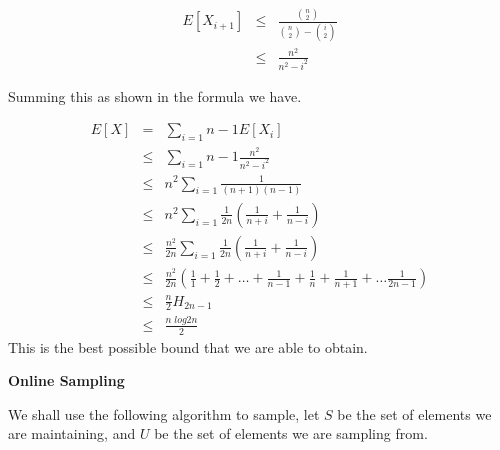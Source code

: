 \documentclass{assignment}
\begin{document}
\begin{problemlist}
\begin{problem}
\begin{answer}
\begin{eqnarray}
E[X_{i+1}] & \leq & \frac{\binom{n}{2}}{\binom{n}{2} - \binom{i}{2}} \\
 & \leq & \frac{n^2}{n^2 - i^2}
\end{eqnarray}

Summing this as shown in the formula we have. 

\begin{eqnarray}
E[X] & = & \sum_{i=1}{n-1}E[X_i] \\
& \leq & \sum_{i=1}{n-1} \frac{n^2}{n^2 - i^2} \\
& \leq & {n^2} \sum_{i=1}\frac{1}{(n+1)(n-1)} \\
& \leq & {n^2} \sum_{i=1}\frac{1}{2n} \left( \frac{1}{n+i} + \frac{1}{n-i} \right) \\
& \leq & \frac{n^2}{2n} \sum_{i=1}\frac{1}{2n} \left( \frac{1}{n+i} + \frac{1}{n-i} \right) \\
& \leq & \frac{n^2}{2n} (\frac{1}{1} + \frac{1}{2} + \ldots + \frac{1}{n-1} + \frac{1}{n} + \frac{1}{n+1} + \ldots \frac{1}{2n-1}) \\
& \leq & \frac{n}{2} H_{2n-1} \\
& \leq & \frac{n \; log 2n }{2}
\end{eqnarray}
This is the best possible bound that we are able to obtain. 
\end{answer} 
\end{problem}
\pbitem
\begin{problem}
\textbf{Online Sampling} \\
 \begin{answer}

We shall use the following algorithm to sample, let $S$ be the set of elements we are maintaining, and $U$ be the set of elements we are sampling from.  


\end{answer}
\end{problem}
\end{problemlist}
\end{document}
